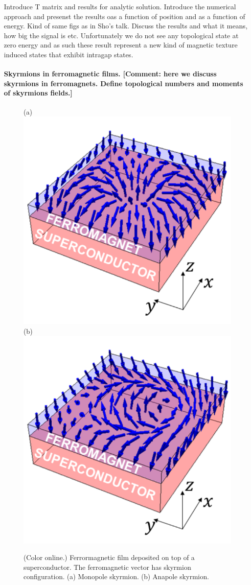 \documentclass[twocolumn,showpacs,floatfix,nofootinbib,longbibliography]{revtex4-1}
\begin{document}
Introduce T matrix and results for analytic solution.  
Introduce the numerical approach and presenst the results oas a function of position and as a function of energy. Kind of same figs as in Sho’s talk. 
Discuss the results and what it means, how big the signal is etc. Unfortunately we do not see any topological state at zero energy and as such these result represent a new kind of magnetic texture induced states that exhibit intragap states.



\paragraph*{Skyrmions in ferromagnetic films. [Comment: here we discuss skyrmions in ferromagnets. Define topological numbers and moments of skyrmions fields.]} \label{sec:skyrmion}

\begin{figure} \centering
(a) \includegraphics[width=0.4\linewidth]{SkyrmA}  
(b) \includegraphics[width=0.4\linewidth]{SkyrmB} 
\caption{(Color online.) Ferrormagnetic film deposited on top of a superconductor. The ferromagnetic vector has skyrmion configuration. (a) Monopole skyrmion.  (b) Anapole skyrmion. } \label{fig:skyrmion}
\end{figure}
\end{document}
